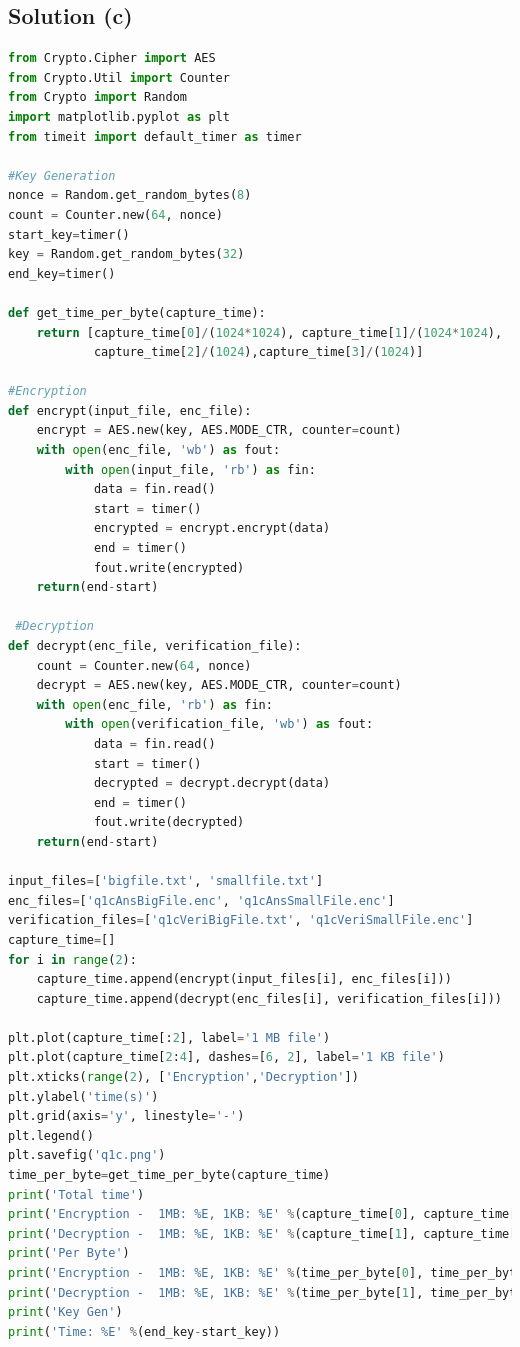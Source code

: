 \documentclass[12pt]{article}%
\begin{document}
\subsection{Solution (c)}
\begin{lstlisting}[language=Python]
from Crypto.Cipher import AES
from Crypto.Util import Counter
from Crypto import Random
import matplotlib.pyplot as plt
from timeit import default_timer as timer

#Key Generation
nonce = Random.get_random_bytes(8)
count = Counter.new(64, nonce)
start_key=timer()
key = Random.get_random_bytes(32)
end_key=timer()

def get_time_per_byte(capture_time):
    return [capture_time[0]/(1024*1024), capture_time[1]/(1024*1024),
            capture_time[2]/(1024),capture_time[3]/(1024)]

#Encryption
def encrypt(input_file, enc_file):
    encrypt = AES.new(key, AES.MODE_CTR, counter=count)
    with open(enc_file, 'wb') as fout:
        with open(input_file, 'rb') as fin:
            data = fin.read()
            start = timer()
            encrypted = encrypt.encrypt(data)
            end = timer()
            fout.write(encrypted)
    return(end-start)
    
 #Decryption  
def decrypt(enc_file, verification_file):
    count = Counter.new(64, nonce)
    decrypt = AES.new(key, AES.MODE_CTR, counter=count)
    with open(enc_file, 'rb') as fin:
        with open(verification_file, 'wb') as fout:
            data = fin.read()
            start = timer()
            decrypted = decrypt.decrypt(data)
            end = timer()
            fout.write(decrypted)
    return(end-start)

input_files=['bigfile.txt', 'smallfile.txt']
enc_files=['q1cAnsBigFile.enc', 'q1cAnsSmallFile.enc']
verification_files=['q1cVeriBigFile.txt', 'q1cVeriSmallFile.enc']
capture_time=[]
for i in range(2):
    capture_time.append(encrypt(input_files[i], enc_files[i]))
    capture_time.append(decrypt(enc_files[i], verification_files[i]))

plt.plot(capture_time[:2], label='1 MB file')
plt.plot(capture_time[2:4], dashes=[6, 2], label='1 KB file')
plt.xticks(range(2), ['Encryption','Decryption'])
plt.ylabel('time(s)')
plt.grid(axis='y', linestyle='-')
plt.legend()
plt.savefig('q1c.png')
time_per_byte=get_time_per_byte(capture_time)
print('Total time')
print('Encryption -  1MB: %E, 1KB: %E' %(capture_time[0], capture_time[2]))
print('Decryption -  1MB: %E, 1KB: %E' %(capture_time[1], capture_time[3]))
print('Per Byte')
print('Encryption -  1MB: %E, 1KB: %E' %(time_per_byte[0], time_per_byte[2]))
print('Decryption -  1MB: %E, 1KB: %E' %(time_per_byte[1], time_per_byte[3]))
print('Key Gen')
print('Time: %E' %(end_key-start_key))

\end{lstlisting}
\end{document}
